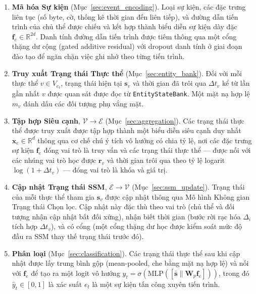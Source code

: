 \documentclass[letterpaper,twocolumn,10pt]{article}
\begin{document}
\begin{enumerate}
    \item \textbf{Mã hóa Sự kiện} (Mục~\ref{sec:event_encoding}). Loại sự kiện, các đặc trưng liên tục (số byte, cờ, thống kê thời gian đến liên tiếp), và đường dẫn tiến trình của chủ thể được chiếu và kết hợp thành biểu diễn sự kiện dày đặc $\mathbf{f}_{e} \in \mathbb{R}^{2d}$. Danh tính đường dẫn tiến trình được tiêm thông qua một cổng thặng dư cộng (gated additive residual) với dropout danh tính ở giai đoạn đào tạo để ngăn chặn việc ghi nhớ theo từng tiến trình.
    
    \item \textbf{Truy xuất Trạng thái Thực thể} (Mục~\ref{sec:entity_bank}). Đối với mỗi thực thể $v \in V_{e_t}$, trạng thái hiện tại $\mathbf{s}_v$ và thời gian đã trôi qua $\Delta t_v$ kể từ lần gần nhất $v$ được quan sát được đọc từ \texttt{EntityStateBank}. Một mặt nạ hợp lệ $m_v$ đánh dấu các đối tượng phụ vắng mặt.
    
    \item \textbf{Tập hợp Siêu cạnh}, $\mathcal{V} \to \mathcal{E}$ (Mục~\ref{sec:aggregation}). Các trạng thái thực thể được truy xuất được tập hợp thành một biểu diễn siêu cạnh duy nhất $\mathbf{x}_e \in \mathbb{R}^d$ thông qua cơ chế chú ý tích vô hướng có chia tỷ lệ, nơi các đặc trưng sự kiện $\mathbf{f}_e$ đóng vai trò là truy vấn và các trạng thái thực thể --- được nối với các nhúng vai trò học được $\mathbf{r}_v$ và thời gian trôi qua theo tỷ lệ logarit $\log(1 + \Delta t_v)$ --- đóng vai trò là khóa và giá trị.
    
    \item \textbf{Cập nhật Trạng thái SSM}, $\mathcal{E} \to \mathcal{V}$ (Mục~\ref{sec:ssm_update}). Trạng thái của mỗi thực thể tham gia $\mathbf{s}_v$ được cập nhật thông qua Mô hình Không gian Trạng thái Chọn lọc. Cập nhật này đặc thù theo vai trò (chủ thể và đối tượng nhận cập nhật bất đối xứng), nhận biết thời gian (bước rời rạc hóa $\Delta_i$ tích hợp $\Delta t_v$), và có cổng (một cổng thặng dư học được kiểm soát mức độ đầu ra SSM thay thế trạng thái trước đó).
    
    \item \textbf{Phân loại} (Mục~\ref{sec:classification}). Các trạng thái thực thể sau khi cập nhật được lấy trung bình gộp (mean-pooled, che bằng mặt nạ hợp lệ) và nối với $\mathbf{f}_e$ để tạo ra một logit vô hướng $\hat{y}_t = \sigma(\text{MLP}([\bar{\mathbf{s}} \parallel \mathbf{W}_p \mathbf{f}_e]))$, trong đó $\hat{y}_t \in [0, 1]$ là xác suất $e_t$ là một sự kiện tấn công xuyên tiến trình.
\end{enumerate}
\end{document}
